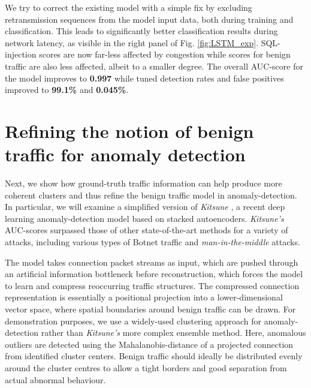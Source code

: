 \documentclass[conference]{IEEEtran}
\begin{document}
We try to correct the existing model with a simple fix by excluding retransmission sequences from the model input data, both during training and classification. This leads to significantly better classification results during network latency, as visible in the right panel of Fig. \ref{fig:LSTM_exp}. SQL-injection scores are now far-less affected by congestion while scores for benign traffic are also less affected, albeit to a smaller degree.
The overall AUC-score for the model improves to \textbf{0.997} while tuned detection rates and false positives improved to \textbf{99.1\%} and \textbf{0.045\%}.



\section{Refining the notion of benign traffic for anomaly detection}\label{Sec:Refining}

Next, we show how ground-truth traffic information can help produce more coherent clusters and thus refine the benign traffic model in anomaly-detection. In particular, we will examine a 
simplified version of \textit{Kitsune} \cite{mirsky2018kitsune}, a recent deep learning anomaly-detection model based on stacked autoencoders. \textit{Kitsune's} AUC-scores surpassed those of other state-of-the-art methods for a variety of attacks, including various types of Botnet traffic and \textit{man-in-the-middle} attacks.

The model takes connection packet streams as input, which are pushed through an artificial information bottleneck before reconstruction, which forces the model to learn and compress reoccurring traffic structures. The compressed connection representation is essentially a positional projection into a lower-dimensional vector space, where spatial boundaries around benign traffic can be drawn. For demonstration purposes, we use a widely-used clustering approach for anomaly-detection rather than \textit{Kitsune's} more complex ensemble method. 
Here, anomalous outliers are detected using the Mahalanobis-distance of a projected connection from identified cluster centers. %
Benign traffic should ideally be distributed evenly around the cluster centres to allow a tight borders and good separation from actual abnormal behaviour.
\end{document}
